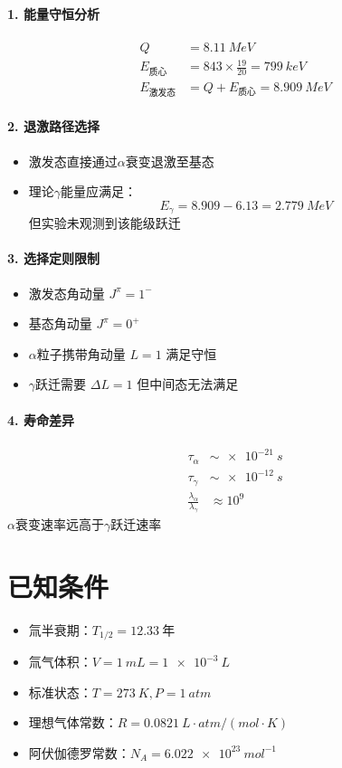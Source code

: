 \documentclass[12pt]{article}
\begin{document}
\paragraph{1. 能量守恒分析}
\begin{align*}
Q &= \SI{8.11}{MeV} \\
E_{\text{质心}} &= 843 \times \frac{19}{20} = \SI{799}{keV} \\
E_{\text{激发态}} &= Q + E_{\text{质心}} = \SI{8.909}{MeV}
\end{align*}

\paragraph{2. 退激路径选择}
\begin{itemize}
\item 激发态直接通过$\alpha$衰变退激至基态
\item 理论$\gamma$能量应满足：
$$
E_\gamma = 8.909 - 6.13 = \SI{2.779}{MeV}
$$
但实验未观测到该能级跃迁
\end{itemize}

\paragraph{3. 选择定则限制}
\begin{itemize}
\item 激发态角动量 $J^\pi = 1^-$
\item 基态角动量 $J^\pi = 0^+$
\item $\alpha$粒子携带角动量 $L=1$ 满足守恒
\item $\gamma$跃迁需要 $\Delta L=1$ 但中间态无法满足
\end{itemize}

\paragraph{4. 寿命差异}
\begin{align*}
\tau_\alpha &\sim \SI{e-21}{s} \\
\tau_\gamma &\sim \SI{e-12}{s} \\
\frac{\lambda_\alpha}{\lambda_\gamma} &\approx 10^9
\end{align*}
$\alpha$衰变速率远高于$\gamma$跃迁速率

\section*{已知条件}
\begin{itemize}
  \item 氚半衰期：$ T_{1/2} = \SI{12.33}{年} $
  \item 氚气体积：$ V = \SI{1}{mL} = \SI{1e-3}{L} $
  \item 标准状态：$ T = \SI{273}{K}, P = \SI{1}{atm} $
  \item 理想气体常数：$ R = \SI{0.0821}{L\cdot atm/(mol\cdot K)} $
  \item 阿伏伽德罗常数：$ N_A = \SI{6.022e23}{mol^{-1}} $
\end{itemize}
\end{document}
